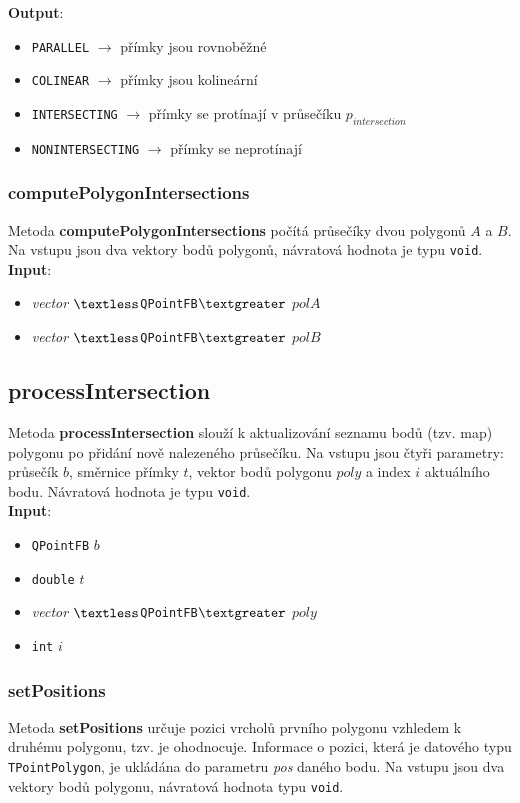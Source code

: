 \documentclass[a4paper, 12pt]{article}
\begin{document}
\textbf{Output}:
\begin{itemize}
\item \texttt{PARALLEL} $\rightarrow$ přímky jsou rovnoběžné
\item \texttt{COLINEAR} $\rightarrow$ přímky jsou kolineární
\item \texttt{INTERSECTING} $\rightarrow$ přímky se protínají v průsečíku $p_{intersection}$
\item \texttt{NONINTERSECTING} $\rightarrow$ přímky se neprotínají
\end{itemize}

\subsubsection*{computePolygonIntersections}
Metoda \textbf{computePolygonIntersections} počítá průsečíky dvou polygonů $A$ a $B$. Na vstupu jsou dva vektory bodů polygonů, návratová hodnota je typu \texttt{void}.\\

\textbf{Input}:
\begin{itemize}
\item \textsl{vector} $\textless$\texttt{QPointFB}$\textgreater$ $polA$
\item \textsl{vector} $\textless$\texttt{QPointFB}$\textgreater$ $polB$
\end{itemize}

\subsection*{processIntersection}
Metoda \textbf{processIntersection} slouží k aktualizování seznamu bodů (tzv. map) polygonu po přidání nově nalezeného průsečíku. Na vstupu jsou čtyři parametry: průsečík $b$, směrnice přímky $t$, vektor bodů polygonu $poly$ a index $i$ aktuálního bodu. Návratová hodnota je typu \texttt{void}.\\

\textbf{Input}:
\begin{itemize}
\item \texttt{QPointFB} $b$
\item \texttt{double} $t$
\item \textsl{vector} $\textless$\texttt{QPointFB}$\textgreater$ $poly$
\item \texttt{int} $i$
\end{itemize}

\subsubsection*{setPositions}
Metoda \textbf{setPositions} určuje pozici vrcholů prvního polygonu vzhledem k druhému polygonu, tzv. je ohodnocuje. Informace o pozici, která je datového typu \texttt{TPointPolygon}, je ukládána do parametru \textit{pos} daného bodu. Na vstupu jsou dva vektory bodů polygonu, návratová hodnota typu \texttt{void}.\\
\end{document}
